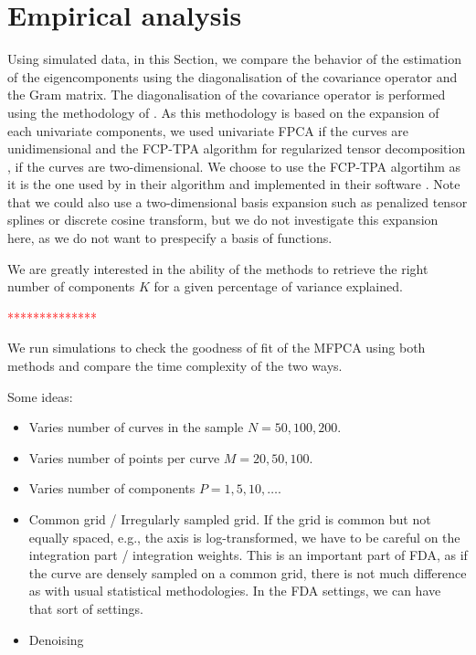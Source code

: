 \section{Empirical analysis} %
\label{sec:empirical_analysis}

Using simulated data, in this Section, we compare the behavior of the estimation of the eigencomponents using the diagonalisation of the covariance operator and the Gram matrix. The diagonalisation of the covariance operator is performed using the methodology of \cite{happMultivariateFunctionalPrincipal2015}. As this methodology is based on the expansion of each univariate components, we used univariate FPCA if the curves are unidimensional and the FCP-TPA algorithm for regularized tensor decomposition \citep{allenMultiwayFunctionalPrincipal2013a}, if the curves are two-dimensional. We choose to use the FCP-TPA algortihm as it is the one used by \cite{happMultivariateFunctionalPrincipal2015} in their algorithm and implemented in their software \citep{happ-kurzObjectOrientedSoftwareFunctional2020}. Note that we could also use a two-dimensional basis expansion such as penalized tensor splines or discrete cosine transform, but we do not investigate this expansion here, as we do not want to prespecify a basis of functions.

We are greatly interested in the ability of the methods to retrieve the right number of components $K$ for a given percentage of variance explained.

\textcolor{red}{**************}

We run simulations to check the goodness of fit of the MFPCA using both methods and compare the time complexity of the two ways. 

Some ideas:
\begin{itemize}
    \item Varies number of curves in the sample $N = 50, 100, 200$.
    \item Varies number of points per curve $M = 20, 50, 100$.
    \item Varies number of components $P = 1, 5, 10, \dots$.
    \item Common grid / Irregularly sampled grid. If the grid is common but not equally spaced, e.g., the axis is log-transformed, we have to be careful on the integration part / integration weights. This is an important part of FDA, as if the curve are densely sampled on a common grid, there is not much difference as with usual statistical methodologies. In the FDA settings, we can have that sort of settings. 
    \item Denoising
\end{itemize}

